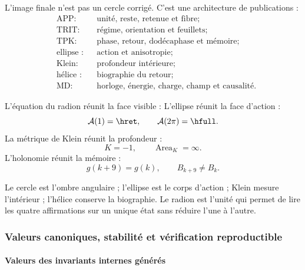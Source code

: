 L'image finale n'est pas un cercle corrigé. C'est une architecture de
publications :
\[
\begin{aligned}
&\text{APP:}&&\text{unité, reste, retenue et fibre};\\
&\text{TRIT:}&&\text{régime, orientation et feuillets};\\
&\text{TPK:}&&\text{phase, retour, dodécaphase et mémoire};\\
&\text{ellipse :}&&\text{action et anisotropie};\\
&\text{Klein:}&&\text{profondeur intérieure};\\
&\text{hélice :}&&\text{biographie du retour};\\
&\text{MD:}&&\text{horloge, énergie, charge, champ et causalité}.
\end{aligned}
\]

L'équation du radion réunit la face visible :
\BigRadionEquation
L'ellipse réunit la face d'action :
\[
\mathcal A(1)=\hret,\qquad \mathcal A(2\pi)=\hfull.
\]
La métrique de Klein réunit la profondeur :
\[
K=-1,\qquad \operatorname{Area}_K=\infty.
\]
L'holonomie réunit la mémoire :
\[
g(k+9)=g(k),\qquad B_{k+9}\ne B_k.
\]

\begin{thesisbox}
Le cercle est l'ombre angulaire ; l'ellipse est le corps d'action ; Klein mesure
l'intérieur ; l'hélice conserve la biographie. Le radion est l'unité qui
permet de lire les quatre affirmations sur un unique état sans réduire l'une à
l'autre.
\end{thesisbox}
\subsubsection{Valeurs canoniques, stabilité et vérification reproductible}

\paragraph{Valeurs des invariants internes générés}


